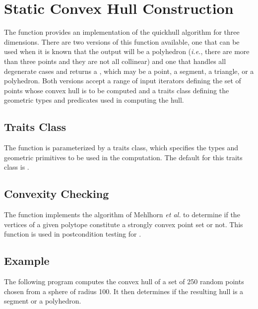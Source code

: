 \section{Static Convex Hull Construction}
\label{sec:convex_hull_3}


The function 
 provides an 
implementation of the quickhull algorithm \cite{bdh-qach-96} for three 
dimensions.  There are two versions of this
function available, one that can be used when it is known that the output
will be a polyhedron (\textit{i.e.}, there are more than three points and
they are not all collinear) and one that handles all degenerate cases
and returns a , which may be a point, a segment, a
triangle, or a polyhedron.  Both versions accept a range of input
iterators defining the set of points whose convex hull is to be computed
and a traits class defining the geometric types and predicates used in
computing the hull.

\subsection{Traits Class}

The function  is parameterized by a traits class,
which specifies the types and geometric primitives to be used in the
computation.  The default for this traits class is
.

\subsection{Convexity Checking}

The function 
implements the algorithm of Mehlhorn \textit{et al.} \cite{mnssssu-cgpvg-96} 
to determine if the vertices of a given polytope constitute a strongly convex 
point set or not.  This function is used in postcondition testing for
.

\subsection{Example}
The following program computes the convex hull of a set of 250 random
points chosen from a sphere of radius 100.  It then determines if the 
resulting hull is a segment or a polyhedron.  

